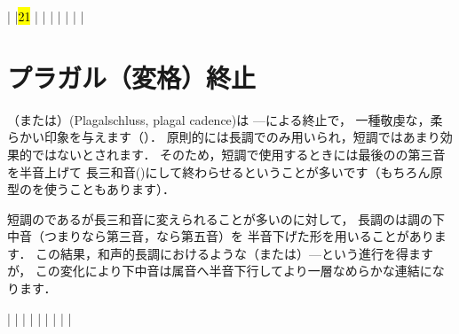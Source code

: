 \documentclass[dvipdfmx,uplatex,b5paper,openany,jbase=12Q,nomag*,textwidth-limit=44%
               ]{gachimuchi}
\begin{document}
\begin{Music}
  \NOTEs%
  |%
  \en\doublebar%
  \NOTes%
  \sk
  |\hl{2}\hl{1}%
  \en\bar\hardspace{\nawidth}%
  \NOTEs%
  |%
  \en\doublebar%
  \NOTEs%
  |%
  \en\bar
  \NOTEs%
  |%
  \en\bar\hardspace{\nawidth}%
  \NOTEs%
  |%
  \en\setdoublebar%
  \endpiece%
\end{Music}

\section{プラガル（変格）終止}
（または）(Plagalschluss, plagal cadence)は
---による終止で，
一種敬虔な，柔らかい印象を与えます（）．
原則的には長調でのみ用いられ，短調ではあまり効果的ではないとされます．
そのため，短調で使用するときには最後の\Gni\Min の第三音を半音上げて
長三和音(\Gni)にして終わらせるということが多いです（もちろん原型の\Gni\Min を使うこともあります）．

短調のである\Gni\Min が長三和音に変えられることが多いのに対して，
長調のは調の下中音（つまり\Gniv なら第三音，\Gnii なら第五音）を
半音下げた形を用いることがあります．
この結果，和声的長調におけるような\Gniv\Min（または\Gnii\Dimt ）\<---\Gni という進行を得ますが，
この変化により下中音は属音へ半音下行してより一層なめらかな連結になります．

\begin{Music}[.6\linewidth]
  \generalmeter{\meterC}%
  \Startpiece%
  \NOTEs%
  |%
  \en\bar
  \NOTEs%
  |%
  \en\doublebar%
  \NOTEs%
  |%
  \en\bar
  \NOTEs%
  |%
  \en{}\Changecontext%
  \NOTEs%
  |%
  \en\bar
  \NOTEs%
  |%
  \en\setdoublebar
  \endpiece
\end{Music}
\end{document}
